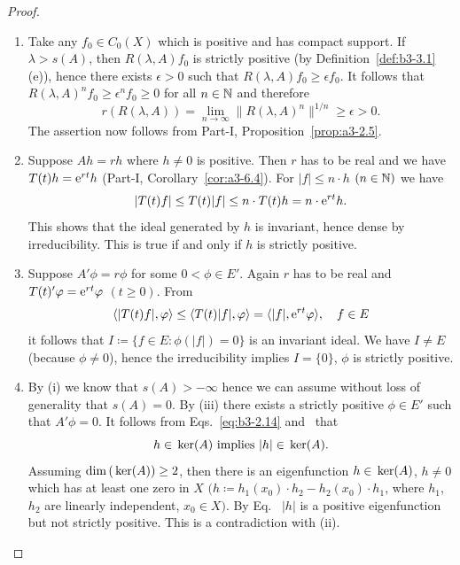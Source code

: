 \begin{proof} 
\begin{enumerate}[\upshape (i), wide, labelindent=.25em]
	\item 
	Take any $f_{0} \in C_{0}(X)$ which is positive and has compact support.
	If\/ $\lambda > s(A)$, then $R(\lambda,A)f_{0}$ is strictly positive (by Definition~\ref{def:b3-3.1}\,(e)), hence there exists $\epsilon > 0$ such that $R(\lambda,A)f_{0} \geq \epsilon f_{0}$.
	It follows that $R(\lambda,A)^nf_{0} \geq \epsilon^nf_{0} \geq 0$ for all $n \in \mathbb{N}$ and therefore
	\[
    r(R(\lambda,A)) = \lim_{n \to \infty}\|R(\lambda,A)^{n}\|^{1/n} \geq \epsilon > 0 .
    \]
	The assertion now follows from Part-I, Proposition~\ref{prop:a3-2.5}.	

	\item 
	Suppose $Ah = rh$ where $h \neq 0$ is positive.
	Then $r$ has to be real and we have $T(t)h = \mathrm{e}^{rt}h$ (Part-I, Corollary~\ref{cor:a3-6.4}).
	For $|f| \leq n\cdot h$ $(n \in \mathbb{N})$ we have
	\begin{equation}\label{eq:b3-3.2}
		|T(t)f| \leq T(t)|f| \leq n\cdot T(t)h = n\cdot \eu^{rt}h.		
	\end{equation}
		This shows that the ideal generated by $h$ is invariant, hence dense by irreducibility.
	This is true if and only if\/ $h$ is strictly positive.
	
	\item 
	Suppose $A'\phi = r\phi$ for some $0 < \phi \in E'$.
	Again $r$ has to be real and $T(t)'\phi = \eu^{rt}\phi$ $(t \geq 0)$.
	From
	\begin{equation}\label{eq:b3-3.3}
	\langle|T(t)f|,\phi\rangle \leq \langle T(t)|f|,\phi\rangle = \langle|f|,\eu^{rt}\phi\rangle, \quad f \in E			
	\end{equation}
	it follows that $I \coloneq \{f \in E \colon \phi(|f|) = 0\}$ is an invariant ideal.
	We have $I \neq E$ (because $\phi \neq 0$), hence the irreducibility implies $I = \{0\}$, \ie $\phi$ is strictly positive.
	
	\item 
	By (i) we know that $s(A) > -\infty$ hence we can assume without loss of generality that $s(A) = 0$.
	By (iii) there exists a strictly positive $\phi \in E'$ such that $A'\phi = 0$.
	It follows from Eqs.~\eqref{eq:b3-2.14} and~ that
	\begin{equation}\label{eq:b3-3.4}
	h \in \mathop{}\mathrm{ker}(A) \text{ implies } |h| \in \mathop{}\mathrm{ker}(A).
	\end{equation}
	Assuming $\dim(\Kern{A}) \geq 2$, then there is an eigenfunction $h \in \mathop{}\mathrm{ker}(A)$, $h \neq 0$ which has at least one zero in $X$ $(h \coloneq h_{1}(x_{0})\cdot h_{2} - h_{2}(x_{0})\cdot h_{1}$, where $h_{1}$, $h_{2}$ are linearly independent, $x_{0} \in X)$.
	By Eq.~ $|h|$ is a positive eigenfunction but not strictly positive.
	This is a contradiction with (ii).
	

\end{enumerate}
\end{proof}
